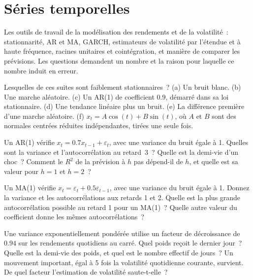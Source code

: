 \chapter{Séries temporelles}\label{ch:iv1:time-series}

\begin{ivtrains}
Les outils de travail de la modélisation des rendements et de la volatilité~: stationnarité, AR et MA, GARCH, estimateurs de volatilité par l'étendue et à haute fréquence, racines unitaires et cointégration, et manière de comparer les prévisions. Les questions demandent un nombre et la raison pour laquelle ce nombre induit en erreur.
\end{ivtrains}

\begin{question}\label{iq:iv1:time-series:1}
Lesquelles de ces suites sont faiblement stationnaires~? (a) Un bruit blanc. (b) Une marche aléatoire. (c) Un AR(1) de coefficient $0.9$, démarré dans sa loi stationnaire. (d) Une tendance linéaire plus un bruit. (e) La différence première d'une marche aléatoire. (f) $x_t = A\cos(t) + B\sin(t)$, où $A$ et $B$ sont des normales centrées réduites indépendantes, tirées une seule fois.
\end{question}

\begin{question}\label{iq:iv1:time-series:2}
Un AR(1) vérifie $x_t = 0.7x_{t-1} + \varepsilon_t$, avec une variance du bruit égale à 1. Quelles sont la variance et l'autocorrélation au retard~3~? Quelle est la demi-vie d'un choc~? Comment le $R^2$ de la prévision à $h$ pas dépend-il de $h$, et quelle est sa valeur pour $h = 1$ et $h = 2$~?
\end{question}

\begin{question}\label{iq:iv1:time-series:3}
Un MA(1) vérifie $x_t = \varepsilon_t + 0.5\varepsilon_{t-1}$, avec une variance du bruit égale à 1. Donnez la variance et les autocorrélations aux retards 1 et 2. Quelle est la plus grande autocorrélation possible au retard 1 pour un MA(1)~? Quelle autre valeur du coefficient donne les mêmes autocorrélations~?
\end{question}

\begin{question}\label{iq:iv1:time-series:4}
Une variance exponentiellement pondérée utilise un facteur de décroissance de $0.94$ sur les rendements quotidiens au carré. Quel poids reçoit le dernier jour~? Quelle est la demi-vie des poids, et quel est le nombre effectif de jours~? Un mouvement important, égal à 5 fois la volatilité quotidienne courante, survient. De quel facteur l'estimation de volatilité saute-t-elle~?
\end{question}

